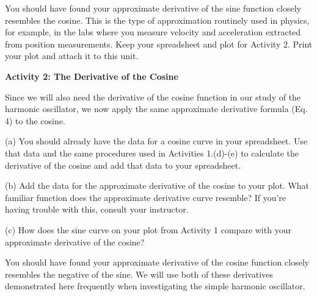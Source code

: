 \vspace{1.8cm}

You should have found your approximate derivative of the sine function closely 
resembles the cosine.
This is the type of approximation routinely used in physics, for example, in the labs
where you measure velocity and acceleration extracted from position measurements.
Keep your spreadsheet and plot for Activity 2.
Print your plot and attach it to this unit.


\textbf{Activity 2: The Derivative of the Cosine} 

Since we will also need the derivative of the cosine function in our study of the
harmonic oscillator, we now apply the same approximate derivative formula (Eq. 4)
to the cosine.

(a) You should already have the data for a cosine curve in your spreadsheet.
Use that data and the same procedures used in Activities 1.(d)-(e) to calculate
the derivative of the cosine and add that data to your spreadsheet.

(b) Add the data for the approximate derivative of the cosine to your plot.
What familiar function does the approximate derivative curve resemble?
If you're having trouble with this, consult your instructor.

\vspace{1.8cm}

(c) How does the sine curve on your plot from Activity 1 compare with 
your approximate derivative of the cosine?

\vspace{1.8cm}

You should have found your approximate derivative of the cosine function closely 
resembles the negative of the sine.
We will use both of these derivatives demonstrated here frequently
when investigating the simple harmonic oscillator.
